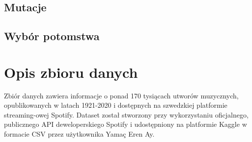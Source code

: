 \documentclass[a4paper,11pt]{article}
\begin{document}
    \subsection{Mutacje}

    \subsection{Wybór potomstwa}


    \section{Opis zbioru danych}

    Zbiór danych zawiera informacje o ponad 170 tysiącach utworów muzycznych, opublikowanych w latach 1921-2020 i dostępnych na szwedzkiej platformie streaming-owej Spotify. Dataset został stworzony przy wykorzystaniu oficjalnego, publicznego API deweloperskiego Spotify i udostępniony na platformie Kaggle w formacie CSV przez użytkownika Yamaç Eren Ay\cite{SpotifyKaggleDataset2020}.

    \bigskip
\end{document}
